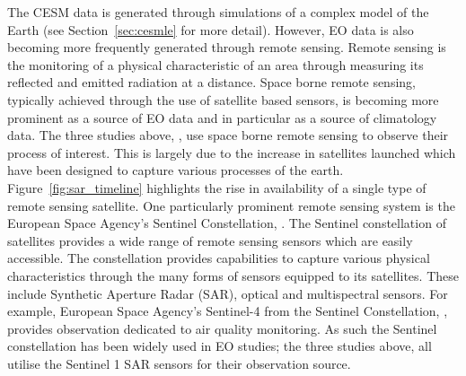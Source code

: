 The CESM data is generated through simulations of a complex model of the Earth (see Section~\ref{sec:cesmle} for more detail).
However, EO data is also becoming more frequently generated through remote sensing.
Remote sensing is the monitoring of a physical characteristic of an area through measuring its reflected and emitted radiation at a distance. 
Space borne remote sensing, typically achieved through the use of satellite based sensors, is becoming more prominent as a source of EO data and in particular as a source of climatology data.
The three studies above, \citep{muro_short-term_2016, raspini_continuous_2018, khabbazan_crop_2019}, use space borne remote sensing to observe their process of interest. 
This is largely due to the increase in satellites launched which have been designed to capture various processes of the earth.
Figure~\ref{fig:sar_timeline} highlights the rise in availability of a single type of remote sensing satellite.
One particularly prominent remote sensing system is the European Space Agency's Sentinel Constellation, \cite{aschbacher_european_2012}.
The Sentinel constellation of satellites provides a wide range of remote sensing sensors which are easily accessible.
The constellation provides capabilities to capture various physical characteristics through the many forms of sensors equipped to its satellites.
These include  Synthetic Aperture Radar (SAR), optical and multispectral sensors.
For example, European Space Agency's Sentinel-4 from the Sentinel Constellation, \cite{aschbacher_european_2012}, provides observation dedicated to air quality monitoring.
As such the Sentinel constellation has been widely used in EO studies; the three studies above, \citep{muro_short-term_2016, khabbazan_crop_2019, raspini_continuous_2018}  all utilise the Sentinel 1 SAR sensors for their observation source. 

